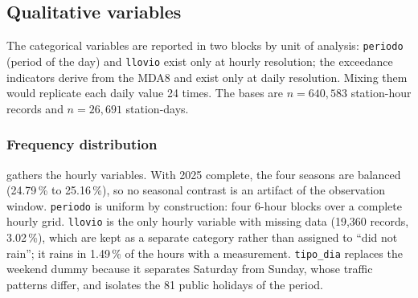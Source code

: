 \subsection{Qualitative variables}
\label{sec:eda-cualitativas}

The categorical variables are reported in two blocks by unit of analysis:
\texttt{periodo} (period of the day) and \texttt{llovio} exist only at
hourly resolution; the exceedance indicators derive from the MDA8 and exist
only at daily resolution. Mixing them would replicate each daily value 24
times. The bases are $n = 640{,}583$ station-hour records and
$n = 26{,}691$ station-days.

\subsubsection{Frequency distribution}

 gathers the hourly variables. With 2025 complete, the
four seasons are balanced (24.79\,\% to 25.16\,\%), so no seasonal contrast is
an artifact of the observation window. \texttt{periodo} is uniform by
construction: four 6-hour blocks over a complete hourly grid.
\texttt{llovio} is the only hourly variable with missing data (19,360
records, 3.02\,\%), which are kept as a separate category rather than
assigned to ``did not rain''; it rains in 1.49\,\% of the hours with a
measurement. \texttt{tipo\_dia} replaces the weekend dummy because it
separates Saturday from Sunday, whose traffic patterns differ, and isolates
the 81 public holidays of the period.

